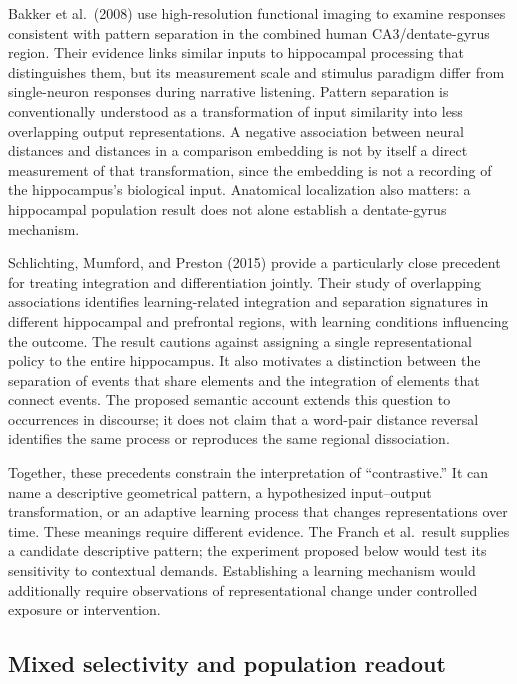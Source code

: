\documentclass[11pt]{article}
\begin{document}
Bakker et al.~(2008) use high-resolution functional imaging to examine
responses consistent with pattern separation in the combined human
CA3/dentate-gyrus region. Their evidence links similar inputs to
hippocampal processing that distinguishes them, but its measurement
scale and stimulus paradigm differ from single-neuron responses during
narrative listening. Pattern separation is conventionally understood as
a transformation of input similarity into less overlapping output
representations. A negative association between neural distances and
distances in a comparison embedding is not by itself a direct
measurement of that transformation, since the embedding is not a
recording of the hippocampus's biological input. Anatomical localization
also matters: a hippocampal population result does not alone establish a
dentate-gyrus mechanism.

Schlichting, Mumford, and Preston (2015) provide a particularly close
precedent for treating integration and differentiation jointly. Their
study of overlapping associations identifies learning-related
integration and separation signatures in different hippocampal and
prefrontal regions, with learning conditions influencing the outcome.
The result cautions against assigning a single representational policy
to the entire hippocampus. It also motivates a distinction between the
separation of events that share elements and the integration of elements
that connect events. The proposed semantic account extends this question
to occurrences in discourse; it does not claim that a word-pair distance
reversal identifies the same process or reproduces the same regional
dissociation.

Together, these precedents constrain the interpretation of
``contrastive.'' It can name a descriptive geometrical pattern, a
hypothesized input--output transformation, or an adaptive learning
process that changes representations over time. These meanings require
different evidence. The Franch et al.~result supplies a candidate
descriptive pattern; the experiment proposed below would test its
sensitivity to contextual demands. Establishing a learning mechanism
would additionally require observations of representational change under
controlled exposure or intervention.

\hypertarget{mixed-selectivity-and-population-readout}{%
\subsection{Mixed selectivity and population
readout}\label{mixed-selectivity-and-population-readout}}
\end{document}
